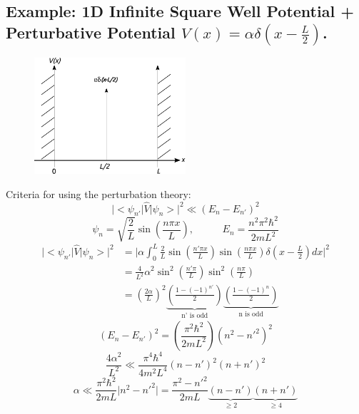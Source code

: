 \documentclass[12pt,fancychapters]{report}
\numberwithin{equation}{section}
\begin{document}
\subsection{Example: 1D Infinite Square Well Potential + Perturbative Potential $V(x) = \alpha 
\delta(x-\frac{L}{2})$.}
\begin{figure}[h]
  \centering
	\includegraphics[width=0.5\textwidth]{../Figures/delta.pdf}
\end{figure}
Criteria for using the perturbation theory:
\begin{equation*}
	\big|\big<\psi_{n'}\big|\hat{V}\big|\psi_n\big>\big|^2 \ll (E_n - E_{n'})^2
\end{equation*}
\begin{equation*}
	\psi_n = \sqrt{\frac{2}{L}} \sin \left(\frac{n\pi x}{L}\right),\,\,\,\,\,\,\,\,\,\,\,\,\,\,\,\,\,
	E_n = \frac{n^2 \pi^2 \hbar^2}{2mL^2}
\end{equation*}
\begin{align*}
	\big|\big<\psi_{n'}\big|\hat{V}\big|\psi_n\big>\big|^2 & = \Bigg |\alpha\int_{0}^{L}\frac{2}{L}
	\sin\left(\frac{n'\pi x}{L}\right) 	\sin\left(\frac{n\pi x}{L}\right) \delta \left(x - 
	\frac{L}{2}\right)dx\Bigg|^2\\
	& = \frac{4}{L^2}\alpha^2 	\sin^2\left(\frac{n'\pi}{L}\right)\sin^2\left(\frac{n\pi}{L}\right)\\
	& = \left(\frac{2\alpha}{L}\right)^2 \underbrace{\left(\frac{1-(-1)^{n'}}{2}\right)}_\text{n' is
	odd}\underbrace{\left(\frac{1-(-1)^{n}}{2}\right)}_\text{n is odd}
\end{align*}
\begin{equation*}
	(E_n-E_{n'})^2 = \left(\frac{\pi^2 \hbar^2}{2mL^2}\right)(n^2 - n'^2)^2
\end{equation*}
\begin{equation*}
	\frac{4\alpha^2}{L^2} \ll \frac{\pi^4 \hbar^4}{4m^2L^4}(n-n')^2(n+n')^2
\end{equation*}
\begin{equation*}
	\alpha \ll \frac{\pi^2 \hbar^2}{2mL}\big|n^2 - n'^2\big| = \frac{\pi^2 - n'^2}{2mL}
	\underbrace{(n-n')}_{\geq 2}\underbrace{(n+n')}_{\geq 4}
\end{equation*}
\end{document}
